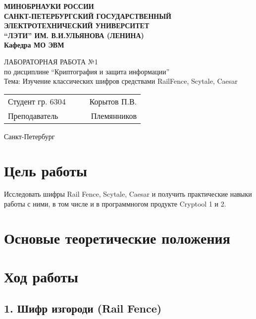 \documentclass[a4paper, 14pt]{extarticle}
\numberwithin{equation}{section}
\begin{document}
\begin{titlepage}
    \centering
    {\bfseries
        \uppercase{
            Минобрнауки России \\
            Санкт-Петербургский государственный \\
            Электротехнический университет \\
            \enquote{ЛЭТИ} им. В.И.Ульянова (Ленина)\\
        }
        Кафедра МО ЭВМ

        \vspace{\fill}
        \uppercase{Лабораторная работа №1} \\
        по дисциплине \enquote{Криптография и защита информации} \\
        Тема: Изучение классических шифров средствами RailFence, Scytale, Caesar
    }

    \vspace{\fill}
    \begin{tabularx}{0.8\textwidth}{l X c r}
        Студент гр. 6304 & & \underline{\hspace{3cm}} & Корытов П.В.\\
        Преподаватель & & \underline{\hspace{3cm}} & Племянников
    \end{tabularx}

    \vspace{1cm}
    Санкт-Петербург \\
    \the\year{}
\end{titlepage}

\newpage

\section*{Цель работы}
Исследовать шифры Rail Fence, Scytale, Caesar и получить практические навыки работы с ними, в том числе и в программногом продукте Cryptool 1 и 2.

\section*{Основые теоретические положения}
\lipsum[3] %

\section*{Ход работы}

\subsection*{1. Шифр изгороди (Rail Fence)}
\end{document}
